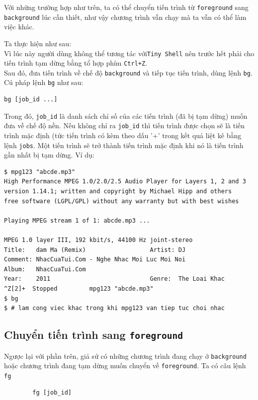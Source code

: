 \documentclass[a4paper,12pt]{report}
\begin{document}
	    Với những trường hợp như trên, ta có thể chuyển tiến trình từ
	    \texttt{foreground} sang \texttt{background} lúc cần thiết, như
	    vậy chương trình vẫn chạy mà ta vẫn có thể làm việc khác.
	
	
	    Ta thực hiện như sau:\\
	
	    Vì lúc này người dùng không thể tương tác với\texttt{Tiny
	    Shell} nên trước hết phải cho tiến trình tạm dừng bằng tổ hợp
	    phím \texttt{Ctrl+Z}.\\
	    Sau đó, đưa tiến trình về chế độ \texttt{background} và tiếp
	    tục tiến trình, dùng lệnh \texttt{bg}. Cú pháp lệnh \texttt{bg}
	    như sau:
	    \begin{verbatim}
bg [job_id ...]
	    \end{verbatim}
	    Trong đó, \texttt{job\_id} là danh sách chỉ số của các tiến
	    trình (đã bị tạm dừng) muốn đưa về chế độ nền. Nếu không chỉ ra
	    \texttt{job\_id} thì tiến trình được chọn sẽ là tiến trình mặc
	    định (tức tiến trình có kèm theo dấu '+' trong kết quả liệt kê
	    bằng lệnh \texttt{jobs}. Một tiến trình sẽ trở thành tiến trình
	    mặc định khi nó là tiến trình gần nhất bị tạm dừng. Ví dụ:
	    \begin{verbatim}
$ mpg123 "abcde.mp3"
High Performance MPEG 1.0/2.0/2.5 Audio Player for Layers 1, 2 and 3
version 1.14.1; written and copyright by Michael Hipp and others
free software (LGPL/GPL) without any warranty but with best wishes

Playing MPEG stream 1 of 1: abcde.mp3 ...

MPEG 1.0 layer III, 192 kbit/s, 44100 Hz joint-stereo
Title:   dam Ma (Remix)                  Artist: DJ
Comment: NhacCuaTui.Com - Nghe Nhac Moi Luc Moi Noi
Album:   NhacCuaTui.Com
Year:    2011                            Genre:  The Loai Khac
^Z[2]+  Stopped         mpg123 "abcde.mp3"
$ bg
$ # lam cong viec khac trong khi mpg123 van tiep tuc choi nhac
	    \end{verbatim}
	
        \subsection{Chuyển tiến trình sang \texttt{foreground}}
	    Ngược lại với phần trên, giả sử có những chương trình đang chạy ở
	    \texttt{background} hoặc chương trình đang tạm dừng muốn chuyển về
	    \texttt{foreground}. Ta có câu lệnh \texttt{fg}
	    \begin{verbatim}
	    fg [job_id]
	    \end{verbatim}
	
\end{document}
